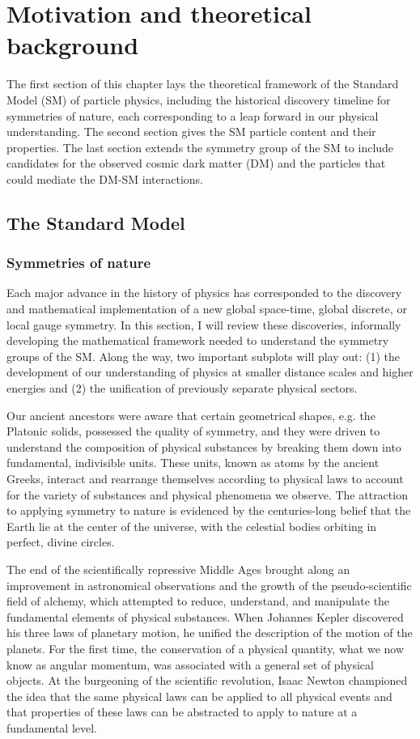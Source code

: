 \chapter{Motivation and theoretical background}

The first section of this chapter lays the theoretical framework of the Standard Model (SM) of particle physics, including the historical discovery timeline for symmetries of nature, each corresponding to a leap forward in our physical understanding. The second section gives the SM particle content and their properties. The last section extends the symmetry group of the SM to include candidates for the observed cosmic dark matter (DM) and the particles that could mediate the DM-SM interactions.

\section{The Standard Model}

\subsection{Symmetries of nature}

Each major advance in the history of physics has corresponded to the discovery and mathematical implementation of a new global space-time, global discrete, or local gauge symmetry. In this section, I will review these discoveries, informally developing the mathematical framework needed to understand the symmetry groups of the SM. Along the way, two important subplots will play out: (1) the development of our understanding of physics at smaller distance scales and higher energies and (2) the unification of previously separate physical sectors.

\indent Our ancient ancestors were aware that certain geometrical shapes, e.g. the Platonic solids, possessed the quality of symmetry, and they were driven to understand the composition of physical substances by breaking them down into fundamental, indivisible units. These units, known as atoms by the ancient Greeks, interact and rearrange themselves according to physical laws to account for the variety of substances and physical phenomena we observe. The attraction to applying symmetry to nature is evidenced by the centuries-long belief that the Earth lie at the center of the universe, with the celestial bodies orbiting in perfect, divine circles.

\indent The end of the scientifically repressive Middle Ages brought along an improvement in astronomical observations and the growth of the pseudo-scientific field of alchemy, which attempted to reduce, understand, and manipulate the fundamental elements of physical substances. When Johannes Kepler discovered his three laws of planetary motion, he unified the description of the motion of the planets. For the first time, the conservation of a physical quantity, what we now know as angular momentum, was associated with a general set of physical objects. At the burgeoning of the scientific revolution, Isaac Newton championed the idea that the same physical laws can be applied to all physical events and that properties of these laws can be abstracted to apply to nature at a fundamental level.

